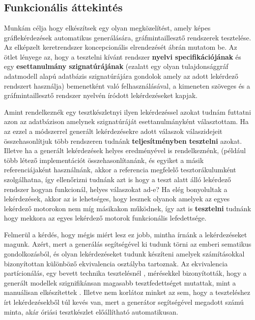 \chapter{\attekintes}

\section{Funkcionális áttekintés}

Munkám célja hogy elkészítsek egy olyan megközelítést, amely képes gráflekérdezések automatikus generálására, gráfmintaillesztő rendszerek tesztelése. Az elképzelt  keretrendszer koncepcionális elrendezését   ábrán mutatom be. Az ötlet lényege az, hogy a tesztelni kívánt rendszer \textbf{nyelvi specifikációjának} és egy \textbf{esettanulmány szignatúrájának} (ezalatt egy olyan tulajdonsággráf adatmodell alapú adatbázis szignatúrájára gondolok amely az adott lekérdező rendszert használja) bemenetként való felhasználásával, a kimeneten szöveges és a gráfmintaillesztő rendszer nyelvén íródott lekérdezéseket kapjak. 

Amint rendelkeznék egy tesztkészletnyi ilyen lekérdezéssel azokat tudnám futtatni azon az adatbázison amelynek szignatúráját esettanulmányként választottam. Ha az ezzel a módszerrel generált lekérdezésekre adott válaszok válaszidejeit összehasonlítjuk több rendszeren tudnánk \textbf{teljesítményben tesztelni} azokat. Illetve ha a generált lekérdezések helyes eredményével is rendelkeznénk, (például több létező implementációt összehasonlítanánk, és egyiket a másik referenciájaként használnánk, akkor a referencia  megfelelő tesztorákulumként szolgálhatna, így ellenőrizni tudnánk azt is hogy a teszt alatt álló lekérdező rendszer hogyan funkcionál, helyes válaszokat ad-e? Ha elég bonyolultak a lekérdezések, akkor az is lehetséges, hogy lesznek olyanok amelyek az egyes lekérdező motorokon nem míg másikakon működnek, így azt is \textbf{tesztelni} tudnánk hogy mekkora az egyes lekérdező motorok funkcionális lefedettsége.
    
Felmerül a kérdés, hogy mégis miért lesz ez jobb, mintha írnánk a lekérdezéseket magunk. Azért, mert a generálás segítségével ki tudunk törni az emberi sematikus gondolkozásból, és olyan lekérdezéseket tudunk készíteni amelyek számításokkal bizonyítottan különböző ekvivalencia osztályba tartoznak. Az ekvivalencia partícionálás, egy bevett  technika tesztelésnél \cite{burnstein2006practical}, mérésekkel bizonyították, hogy a generált modellek szignifikánsan magasabb tesztfedettséget mutattak, mint a manuálisan elkészítettek \cite{semerath2018iterative}. Illetve nem korlátoz minket az sem, hogy a teszteléshez írt lekérdezésekből túl kevés van, mert a generátor segítségével megadott számú minta, akár óriási tesztkészlet előállítható automatikusan.

